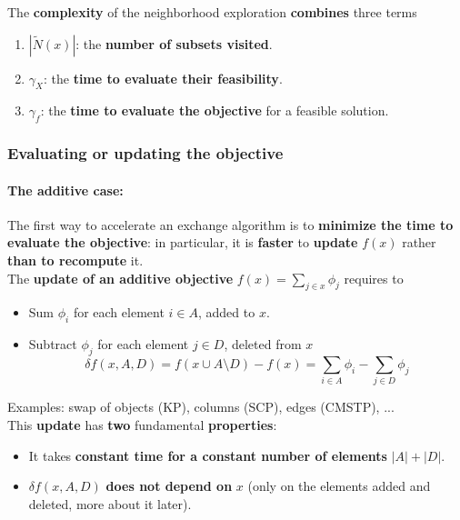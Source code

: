 \documentclass[11pt]{article}
\begin{document}
	The \textbf{complexity} of the neighborhood exploration \textbf{combines} three terms
	\begin{enumerate}
		\item $| \tilde{N} (x) |$: the \textbf{number of subsets visited}.\\
		
		\item $\gamma_X$: the \textbf{time to evaluate their feasibility}.\\
		
		\item $\gamma_f$: the \textbf{time to evaluate the objective} for a feasible solution.\\
	\end{enumerate}
	
	\newpage
	
	\subsubsection{Evaluating or updating the objective}
	
	\paragraph{The additive case:} The first way to accelerate an exchange algorithm is to \textbf{minimize the time to evaluate the objective}: in particular, it is \textbf{faster} to \textbf{update} $f (x)$ rather \textbf{than to recompute} it.\\
	
	The \textbf{update of an additive objective} $f (x) = \sum_{j \in x} \phi_j$ requires to
	\begin{itemize}
		\item Sum $\phi_i$ for each element $i \in A$, added to $x$.\\
		
		\item Subtract $\phi_j$ for each element $j \in D$, deleted from $x$
		$$ \delta f (x, A, D) = f (x \cup A \setminus D) - f(x) = \sum_{i \in A} \phi_i - \sum_{j \in D} \phi_j $$
		\nn
	\end{itemize}
	
	Examples: swap of objects (KP), columns (SCP), edges (CMSTP), ...\\
	
	This \textbf{update} has \textbf{two} fundamental \textbf{properties}:
	\begin{itemize}
		\item It takes \textbf{constant time for a constant number of elements} $|A| + |D|$.\\
		
		\item $\delta f (x, A, D)$ \textbf{does not depend on} $x$ (only on the elements added and deleted, more about it later).\\
	\end{itemize}
	
\end{document}
